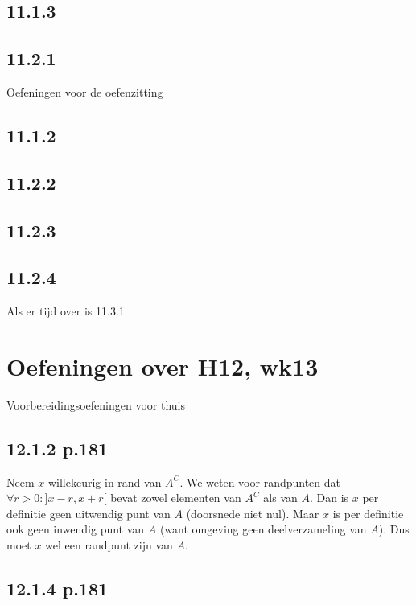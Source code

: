 \documentclass{article}
\begin{document}
\subsection{11.1.3}

\subsection{11.2.1} 

Oefeningen voor de oefenzitting 


\subsection{11.1.2}

\subsection{11.2.2} 

\subsection{11.2.3} 

\subsection{11.2.4} 

Als er tijd over is 11.3.1


\section{Oefeningen over H12, wk13} 

Voorbereidingsoefeningen voor thuis

\subsection{12.1.2 p.181}  

Neem $x$ willekeurig in rand van $A^C$. 
We weten voor randpunten dat $\forall r>0: ] x-r,x+r [ $ bevat zowel elementen van $A^C$ als van $A$. 
Dan is $x$ per definitie geen uitwendig punt van $A$ (doorsnede niet nul). Maar $x$ is per definitie ook geen inwendig punt van $A$ (want omgeving geen deelverzameling van $A$). Dus moet $x$ wel een randpunt zijn van $A$. 


\subsection{12.1.4 p.181} 
\end{document}

